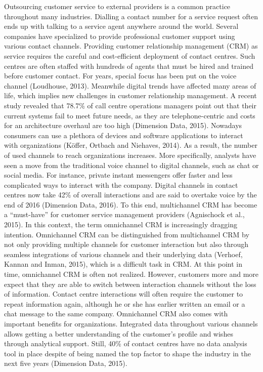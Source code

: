 Outsourcing customer service to external providers is a common practice throughout many industries. Dialling a contact number for a service request often ends up with talking to a service agent anywhere around the world. Several companies have specialized to provide professional customer support using various contact channels. Providing customer relationship management (CRM) as service requires the careful and cost-efficient deployment of contact centres. Such centres are often staffed with hundreds of agents that must be hired and trained before customer contact.
For years, special focus has been put on the voice channel (Loudhouse, 2013). Meanwhile digital trends have affected many areas of life, which implies new challenges in customer relationship management. A recent study revealed that 78.7\% of call centre operations managers point out that their current systems fail to meet future needs, as they are telephone-centric and costs for an architecture overhaul are too high (Dimension Data, 2015). Nowadays consumers can use a plethora of devices and software applications to interact with organizations (Köffer, Ortbach and Niehaves, 2014). As a result, the number of used channels to reach organizations increases. More specifically, analysts have seen a move from the traditional voice channel to digital channels, such as chat or social media. For instance, private instant messengers offer faster and less complicated ways to interact with the company. Digital channels in contact centres now take 42\% of overall interactions and are said to overtake voice by the end of 2016 (Dimension Data, 2016). To this end, multichannel CRM has become a “must-have” for customer service management providers (Agnischock et al., 2015).
In this context, the term omnichannel CRM is increasingly dragging intention. Omnichannel CRM can be distinguished from multichannel CRM by not only providing multiple channels for customer interaction but also through seamless integrations of various channels and their underlying data (Verhoef, Kannan and Inman, 2015), which is a difficult task in CRM. At this point in time, omnichannel CRM is often not realized. However, customers more and more expect that they are able to switch between interaction channels without the loss of information. Contact centre interactions will often require the customer to repeat information again, although he or she has earlier written an email or a chat message to the same company.
Omnichannel CRM also comes with important benefits for organizations. Integrated data throughout various channels allows getting a better understanding of the customer’s profile and wishes through analytical support. Still, 40\% of contact centres have no data analysis tool in place despite of being named the top factor to shape the industry in the next five years (Dimension Data, 2015). 
